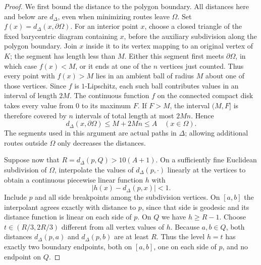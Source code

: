 \begin{proof}
We first bound the distance to the polygon boundary. All distances here
and below are $d_\Delta$, even when minimizing routes leave $\Omega$.
Set $f(x)=d_\Delta(x,\partial\Omega)$.
For an interior point $x$, choose a closed triangle of the fixed
barycentric diagram containing $x$, before the auxiliary subdivision
along the polygon boundary. Join $x$ inside it to its vertex mapping
to an original vertex of $K$; the segment has length less than $M$.
Either this segment first meets $\partial\Omega$, in which case
$f(x)<M$, or it ends at one of the $n$ vertices just counted. Thus every
point with $f(x)>M$ lies in an ambient ball of radius $M$ about one of
those vertices. Since $f$ is $1$-Lipschitz, each such ball contributes
values in an interval of length $2M$. The continuous function $f$ on the
connected compact disk takes every value from $0$ to its maximum $F$.
If $F>M$, the interval $(M,F]$ is therefore covered by $n$ intervals of
total length at most $2Mn$. Hence
\begin{equation}
 d_\Delta(x,\partial\Omega)\le M+2Mn\le A
 \quad (x\in\Omega).
 \label{eq:polygon-inradius}
\end{equation}
The segments used in this argument are actual paths in $\Delta$;
allowing additional routes outside $\Omega$ only decreases the distances.

Suppose now that $R=d_\Delta(p,Q)>10(A+1)$. On a sufficiently fine
Euclidean subdivision of $\Omega$, interpolate the values of
$d_\Delta(p,\cdot)$ linearly at the vertices to obtain a continuous
piecewise linear function $h$ with
\[
 |h(x)-d_\Delta(p,x)|<1.
\]
Include $p$ and all side breakpoints among the subdivision vertices.
On $[a,b]$ the interpolant agrees exactly with distance to $p$, since
that side is geodesic and its distance function is linear on each side
of $p$. On $Q$ we have $h\ge R-1$. Choose
$t\in(R/3,2R/3)$ different from all vertex values of $h$.
Because $a,b\in Q$, both distances $d_\Delta(p,a)$ and
$d_\Delta(p,b)$ are at least $R$. Thus the level $h=t$ has exactly two
boundary endpoints, both on $[a,b]$, one on each side of $p$, and no
endpoint on $Q$.


\end{proof}
